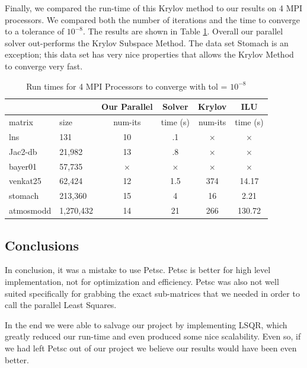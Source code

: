 \documentclass[a4paper,12pt]{article}
\begin{document}
Finally, we compared the run-time of this Krylov method to our results on 4 MPI processors. We compared both the number of iterations and the time to converge to a tolerance of $10^{-8}$. The results are shown in Table \ref{tab:finalresults}. Overall our parallel solver out-performs the Krylov Subspace Method. The data set Stomach is an exception; this data set has very nice properties that allows the Krylov Method to converge very fast.
\begin{table}
\begin{center}
\begin{tabular}{| l | l | c  c | c  c |}
\hline
                         &                & Our Parallel & Solver & Krylov & ILU\\
                          \hline
    matrix           & size         &    num-its & time (s)     &  num-its & time (s)        \\
 \hline
 lns                   & 131             &     10   &         .1  & \color{red} $\times$  &  \color{red} $\times$\\
 Jac2-db            & 21,982     &    13     &     .8      &  \color{red} $\times$  & \color{red} $\times$ \\
 bayer01        & 57,735  &  \color{red} $\times$    &   \color{red} $\times$    &  \color{red} $\times$  & \color{red} $\times$ \\
 venkat25         & 62,424      & 12     &     1.5   & 374                   & 14.17 \\
 stomach          & 213,360    &   15    & 4 & 16                   & 2.21 \\
 atmosmodd     & 1,270,432 &  14    &  21 &  266                   & 130.72 \\
 \hline

\end{tabular}
\end{center}
\caption{Run times for 4 MPI Processors to converge with tol = $10^{-8}$}
\label{tab:finalresults}
\end{table}


\subsection{Conclusions}
In conclusion, it was a mistake to use Petsc. Petsc is better for high level implementation, not for optimization and efficiency. Petsc was also not well suited specifically for grabbing the exact sub-matrices that we needed in order to call the parallel Least Squares. 

In the end we were able to salvage our project by implementing LSQR, which greatly reduced our run-time and even produced some nice scalability. Even so, if we had left Petsc out of our project we believe our results would have been even better.
\end{document}
